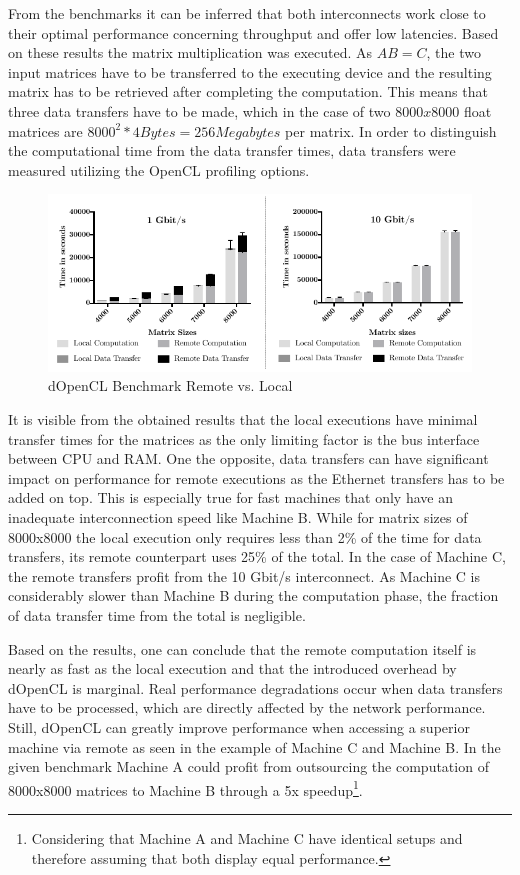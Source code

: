 From the benchmarks it can be inferred that both interconnects work close to their optimal performance concerning throughput and offer low latencies. Based on these results the matrix multiplication was executed. As $AB = C$, the two input matrices have to be transferred to the executing device and the resulting matrix has to be retrieved after completing the computation. This means that three data transfers have to be made, which in the case of two $8000x8000$ float matrices are $8000^2 * 4 Bytes = 256 Megabytes$ per matrix. In order to distinguish the computational time from the data transfer times, data transfers were measured utilizing the OpenCL profiling options.

\begin{figure}[H]

\includegraphics[width=1.0\textwidth]{images/data_transfer.pdf}
\centering
\caption{dOpenCL Benchmark Remote vs. Local}
\label{img:data_transfer}
\end{figure}

It is visible from the obtained results that the local executions have minimal transfer times for the matrices as the only limiting factor is the bus interface between CPU and RAM. One the opposite, data transfers can have significant impact on performance for remote executions as the Ethernet transfers has to be added on top. This is especially true for fast machines that only have an inadequate interconnection speed like Machine B. While for matrix sizes of 8000x8000 the local execution only requires less than 2\% of the time for data transfers, its remote counterpart uses 25\% of the total. In the case of Machine C, the remote transfers profit from the 10 Gbit/s interconnect. As Machine C is considerably slower than Machine B during the computation phase, the fraction of data transfer time from the total is negligible.

Based on the results, one can conclude that the remote computation itself is nearly as fast as the local execution and that the introduced overhead by dOpenCL is marginal. Real performance degradations occur when data transfers have to be processed, which are directly affected by the network performance. Still, dOpenCL can greatly improve performance when accessing a superior machine via remote as seen in the example of Machine C and Machine B. In the given benchmark Machine A could profit from outsourcing the computation of 8000x8000 matrices to Machine B through a 5x speedup\footnote{Considering that Machine A and Machine C have identical setups and therefore assuming that both display equal performance.}.

